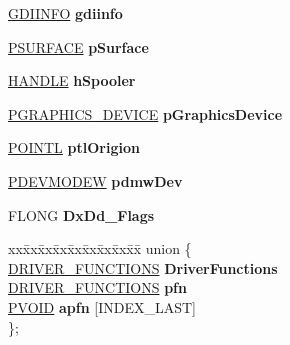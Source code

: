 \begin{DoxyCompactItemize}
\hyperlink{struct___g_d_i_i_n_f_o}{G\+D\+I\+I\+N\+FO} {\bfseries gdiinfo}
\item 
\mbox{\label{struct___p_d_e_v_o_b_j_a05189ba9807b3252a06853776c11176c}} 
\hyperlink{struct___s_u_r_f_a_c_e}{P\+S\+U\+R\+F\+A\+CE} {\bfseries p\+Surface}
\item 
\mbox{\label{struct___p_d_e_v_o_b_j_a68dab08b7deaa0f3c0735a8100175a65}} 
\hyperlink{interfacevoid}{H\+A\+N\+D\+LE} {\bfseries h\+Spooler}
\item 
\mbox{\label{struct___p_d_e_v_o_b_j_a9385b1d2d9ebed7ead6b5faa7765cd4a}} 
\hyperlink{struct___g_r_a_p_h_i_c_s___d_e_v_i_c_e}{P\+G\+R\+A\+P\+H\+I\+C\+S\+\_\+\+D\+E\+V\+I\+CE} {\bfseries p\+Graphics\+Device}
\item 
\mbox{\label{struct___p_d_e_v_o_b_j_a75f309de178d5a9001d1afe4df99546b}} 
\hyperlink{struct___p_o_i_n_t_l}{P\+O\+I\+N\+TL} {\bfseries ptl\+Origion}
\item 
\mbox{\label{struct___p_d_e_v_o_b_j_a697861e24dc2186b4b065a9dec789b3e}} 
\hyperlink{struct__devicemode_w}{P\+D\+E\+V\+M\+O\+D\+EW} {\bfseries pdmw\+Dev}
\item 
\mbox{\label{struct___p_d_e_v_o_b_j_a1abdc62687ad504c067b2cecb696dcda}} 
F\+L\+O\+NG {\bfseries Dx\+Dd\+\_\+\+Flags}
\item 
\mbox{\label{struct___p_d_e_v_o_b_j_a515a637f30dcd5cbab81488a2f9bb908}} 
\begin{tabbing}
xx\=xx\=xx\=xx\=xx\=xx\=xx\=xx\=xx\=\kill
union \{\\
\>\hyperlink{struct___d_r_i_v_e_r___f_u_n_c_t_i_o_n_s}{DRIVER\_FUNCTIONS} {\bfseries DriverFunctions}\\
\>\hyperlink{struct___d_r_i_v_e_r___f_u_n_c_t_i_o_n_s}{DRIVER\_FUNCTIONS} {\bfseries pfn}\\
\>\hyperlink{interfacevoid}{PVOID} {\bfseries apfn} \mbox{[}INDEX\_LAST\mbox{]}\\
\}; \\


\end{tabbing}
\end{DoxyCompactItemize}
